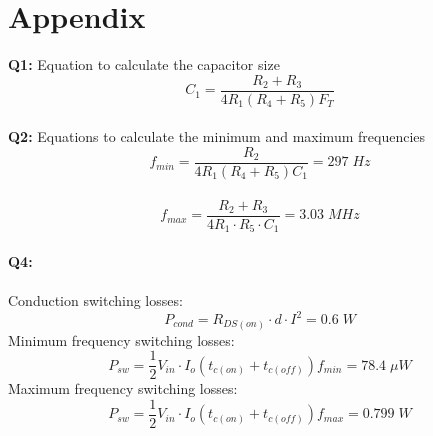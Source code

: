 \documentclass[a4paper,11pt]{article}
\begin{document}
\begin{preview}
\begin{enumerate}
\end{enumerate}

\section*{Appendix}

\textbf{Q1:} Equation to calculate the capacitor size
$$ C_{1}=\frac{R_{2}+R_{3}}{4R_{1}\left(R_{4}+R_{5}\right)F_{T}} $$\\

\textbf{Q2:} Equations to calculate the minimum and maximum frequencies
$$ f_{min}=\frac{R_{2}}{4R_{1}\left(R_{4}+R_{5}\right)C_{1}} = 297\;Hz $$ \\
$$ f_{max}=\frac{R_{2}+R_{3}}{4R_{1}\cdot R_{5}\cdot C_{1}} = 3.03\;MHz $$\\

\textbf{Q4:} \\\\
Conduction switching losses:
$$ P_{cond} = R_{DS(on)} \cdot d \cdot I^2 = 0.6\;W $$
Minimum frequency switching losses:
$$ P_{sw} = \frac{1}{2}V_{in} \cdot I_o (t_{c(on)} + t_{c(off)})f_{min} = 78.4 \;\mu W $$
Maximum frequency switching losses:
$$ P_{sw} = \frac{1}{2}V_{in} \cdot I_o (t_{c(on)} + t_{c(off)})f_{max} = 0.799 \; W $$


\end{preview}
\end{document}
